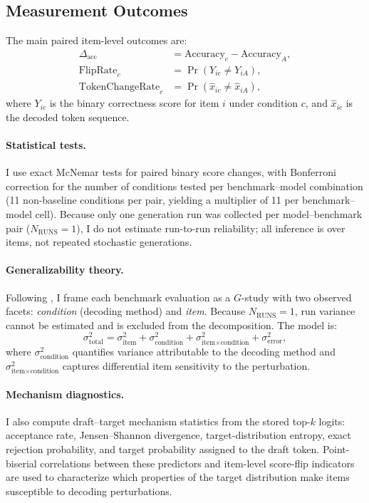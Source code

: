 \documentclass{article}
\begin{document}
\subsection{Measurement Outcomes}

The main paired item-level outcomes are:
\begin{align}
\Delta_{\text{acc}} &= \text{Accuracy}_{c} - \text{Accuracy}_{A},\\
\text{FlipRate}_{c} &= \Pr(Y_{ic} \neq Y_{iA}),\\
\text{TokenChangeRate}_{c} &= \Pr(\hat{x}_{ic} \neq \hat{x}_{iA}),
\end{align}
where $Y_{ic}$ is the binary correctness score for item $i$ under condition $c$, and $\hat{x}_{ic}$ is the decoded token sequence.

\paragraph{Statistical tests.} I use exact McNemar tests for paired binary score changes, with Bonferroni correction for the number of conditions tested per benchmark--model combination (11 non-baseline conditions per pair, yielding a multiplier of 11 per benchmark--model cell). Because only one generation run was collected per model--benchmark pair ($N_{\text{RUNS}}{=}1$), I do not estimate run-to-run reliability; all inference is over items, not repeated stochastic generations.

\paragraph{Generalizability theory.} Following \citet{cronbach1972dependability}, I frame each benchmark evaluation as a $G$-study with two observed facets: \emph{condition} (decoding method) and \emph{item}. Because $N_{\text{RUNS}}{=}1$, run variance cannot be estimated and is excluded from the decomposition. The model is:
\begin{equation}
\sigma^2_{\text{total}} = \sigma^2_{\text{item}} + \sigma^2_{\text{condition}} + \sigma^2_{\text{item} \times \text{condition}} + \sigma^2_{\text{error}},
\end{equation}
where $\sigma^2_{\text{condition}}$ quantifies variance attributable to the decoding method and $\sigma^2_{\text{item} \times \text{condition}}$ captures differential item sensitivity to the perturbation.

\paragraph{Mechanism diagnostics.} I also compute draft--target mechanism statistics from the stored top-$k$ logits: acceptance rate, Jensen--Shannon divergence, target-distribution entropy, exact rejection probability, and target probability assigned to the draft token. Point-biserial correlations between these predictors and item-level score-flip indicators are used to characterize which properties of the target distribution make items susceptible to decoding perturbations.
\end{document}

